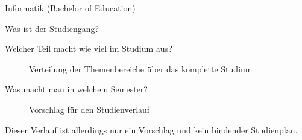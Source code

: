 	\begin{LARGE}
			Informatik (Bachelor of Education)
		\end{LARGE}
		\begin{exampleblock}{Was ist der Studiengang?}
			
		\end{exampleblock}
	
	\begin{block}{Welcher Teil macht wie viel im Studium aus?}
		\begin{figure}[h!]
			\caption{Verteilung der Themenbereiche über das komplette Studium}
		\end{figure}
	\end{block}
	
	\begin{block}{Was macht man in welchem Semester?}
		\begin{figure}[h!]
			\caption{Vorschlag für den Studienverlauf}
		\end{figure}
		Dieser Verlauf ist allerdings nur ein Vorschlag und kein bindender Studienplan.
	\end{block}
